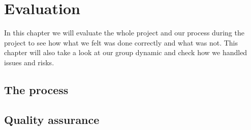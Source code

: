 \section{Evaluation}
In this chapter we will evaluate the whole project and our process during the project to see how what we felt was done correctly and what was not. This chapter will also take a look at our group dynamic and check how we handled issues and risks.

\subsection{The process}


\subsection{Quality assurance}